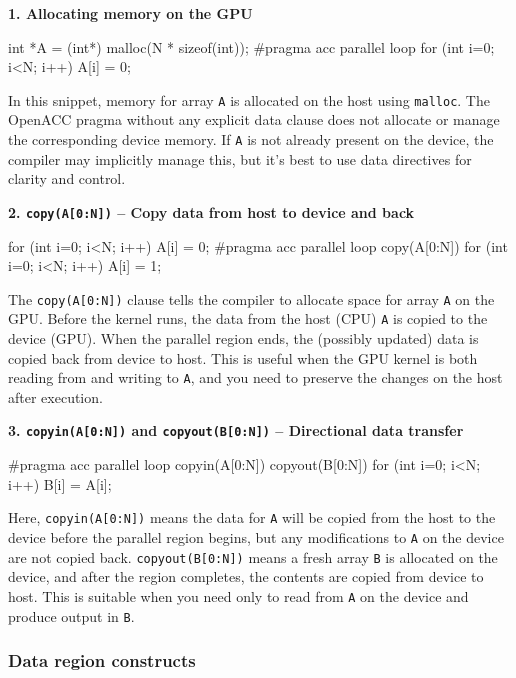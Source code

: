 \textbf{1. Allocating memory on the GPU}

\begin{codeblock}[language=C]
int *A = (int*) malloc(N * sizeof(int));
#pragma acc parallel loop
{
    for (int i=0; i<N; i++) A[i] = 0;
}
\end{codeblock}

In this snippet, memory for array \texttt{A} is allocated on the host using \texttt{malloc}. The OpenACC pragma without any explicit data clause does not allocate or manage the corresponding device memory. If \texttt{A} is not already present on the device, the compiler may implicitly manage this, but it's best to use data directives for clarity and control.

\textbf{2. \texttt{copy(A[0:N])} -- Copy data from host to device and back}

\begin{codeblock}[language=C]
for (int i=0; i<N; i++) A[i] = 0;
#pragma acc parallel loop copy(A[0:N])
{
    for (int i=0; i<N; i++) A[i] = 1;
}
\end{codeblock}

The \texttt{copy(A[0:N])} clause tells the compiler to allocate space for array \texttt{A} on the GPU. Before the kernel runs, the data from the host (CPU) \texttt{A} is copied to the device (GPU). When the parallel region ends, the (possibly updated) data is copied back from device to host. This is useful when the GPU kernel is both reading from and writing to \texttt{A}, and you need to preserve the changes on the host after execution.

\textbf{3. \texttt{copyin(A[0:N])} and \texttt{copyout(B[0:N])} -- Directional data transfer}

\begin{codeblock}[language=C]
#pragma acc parallel loop copyin(A[0:N]) copyout(B[0:N])
{
    for (int i=0; i<N; i++) B[i] = A[i];
}
\end{codeblock}

Here, \texttt{copyin(A[0:N])} means the data for \texttt{A} will be copied from the host to the device before the parallel region begins, but any modifications to \texttt{A} on the device are not copied back. \texttt{copyout(B[0:N])} means a fresh array \texttt{B} is allocated on the device, and after the region completes, the contents are copied from device to host. This is suitable when you need only to read from \texttt{A} on the device and produce output in \texttt{B}.

\subsubsection{Data region constructs}

